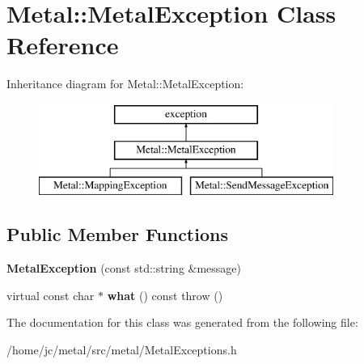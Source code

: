 \hypertarget{classMetal_1_1MetalException}{}\section{Metal\+:\+:Metal\+Exception Class Reference}
\label{classMetal_1_1MetalException}
Inheritance diagram for Metal\+:\+:Metal\+Exception\+:\begin{figure}[H]
\begin{center}
\leavevmode
\includegraphics[height=3.000000cm]{classMetal_1_1MetalException}
\end{center}
\end{figure}
\subsection*{Public Member Functions}
\begin{DoxyCompactItemize}
\item 
\hypertarget{classMetal_1_1MetalException_afa58e4cd82c3aca7a138024fd1b6f090}{}{\bfseries Metal\+Exception} (const std\+::string \&message)\label{classMetal_1_1MetalException_afa58e4cd82c3aca7a138024fd1b6f090}

\item 
\hypertarget{classMetal_1_1MetalException_a74fa237bd4484764faccfbebd54801b5}{}virtual const char $\ast$ {\bfseries what} () const   throw ()\label{classMetal_1_1MetalException_a74fa237bd4484764faccfbebd54801b5}

\end{DoxyCompactItemize}


The documentation for this class was generated from the following file\+:\begin{DoxyCompactItemize}
\item 
/home/jc/metal/src/metal/Metal\+Exceptions.\+h\end{DoxyCompactItemize}
